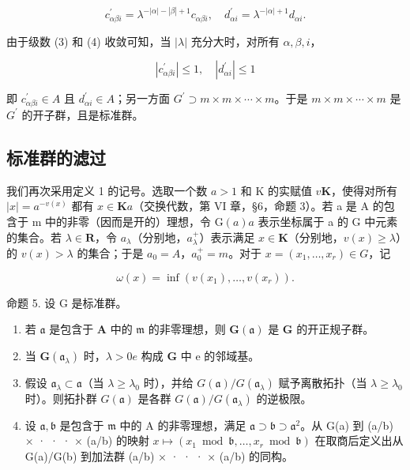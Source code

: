\[
c _ {\alpha \beta i} ^ {\prime} = \lambda^ {- | \alpha | - | \beta | + 1} c _ {\alpha \beta i}, \quad d _ {\alpha i} ^ {\prime} = \lambda^ {- | \alpha | + 1} d _ {\alpha i}.
\]

由于级数 (3) 和 (4) 收敛可知，当 \(|\lambda|\) 充分大时，对所有 \(\alpha, \beta, i\)，

\[
\left| c _ {\alpha \beta i} ^ {\prime} \right| \leqslant 1, \quad \left| d _ {\alpha i} ^ {\prime} \right| \leqslant 1
\]

即 \(c_{\alpha\beta i}^{\prime}\in A\) 且 \(d_{\alpha i}^{\prime}\in A\)；另一方面 \(G^{\prime}\supset m\times m\times\cdots\times m\)。于是 \(m\times m\times\cdots\times m\) 是 \(G^{\prime}\) 的开子群，且是标准群。

\subsection{标准群的滤过}

我们再次采用定义 1 的记号。选取一个数 \(a > 1\) 和 K 的实赋值 \(v\)\(\mathbf{K}\)，使得对所有 \(|x| = a^{-v(x)}\) 都有 \(x \in \mathbf{K}\)\(a\)（交换代数，第 VI 章，§6，命题 3）。若 a 是 A 的包含于 m 中的非零（因而是开的）理想，令 \(\mathrm{G}(a)\)\(a\) 表示坐标属于 a 的 G 中元素的集合。若 \(\lambda \in \mathbf{R}\)，令 \(a_{\lambda}\)（分别地，\(a_{\lambda}^{+}\)）表示满足 \(x \in \mathbf{K}\)（分别地，\(v(x) \geqslant \lambda\)）的 \(v(x) > \lambda\) 的集合；于是 \(a_0 = A\)，\(a_0^+ = m\)。对于 \(x = (x_1, \ldots, x_r) \in G\)，记

\[
\omega (x) = \inf (v (x _ {1}), \dots , v (x _ {r})).\tag{5}
\]

命题 5. 设 G 是标准群。

\begin{enumerate}
\def\labelenumi{(\roman{enumi})}
\item
  若 \(\mathfrak{a}\) 是包含于 \(\mathbf{A}\) 中的 \(\mathfrak{m}\) 的非零理想，则 \(\mathbf{G}(\mathfrak{a})\) 是 \(\mathbf{G}\) 的开正规子群。
\item
  当 \(\mathbf{G}(\mathfrak{a}_{\lambda})\) 时，\(\lambda > 0\)\(e\) 构成 \(\mathbf{G}\) 中 e 的邻域基。
\item
  假设 \(\mathfrak{a}_{\lambda} \subset \mathfrak{a}\)（当 \(\lambda \geqslant \lambda_0\) 时），并给 \(G(\mathfrak{a}) / G(\mathfrak{a}_{\lambda})\) 赋予离散拓扑（当 \(\lambda \geqslant \lambda_0\) 时）。则拓扑群 \(G(\mathfrak{a})\) 是各群 \(G(\mathfrak{a}) / G(\mathfrak{a}_{\lambda})\) 的逆极限。
\item
  设 \(\mathfrak{a},\mathfrak{b}\) 是包含于 \(\mathfrak{m}\) 中的 A 的非零理想，满足 \(\mathfrak{a} \supset \mathfrak{b} \supset \mathfrak{a}^2\)。从 G(a) 到 (a/b) × · · · × (a/b) 的映射 \(x \mapsto (x_1 \bmod \mathfrak{b}, \ldots, x_r \bmod \mathfrak{b})\) 在取商后定义出从 G(a)/G(b) 到加法群 (a/b) × · · · × (a/b) 的同构。
\end{enumerate}

